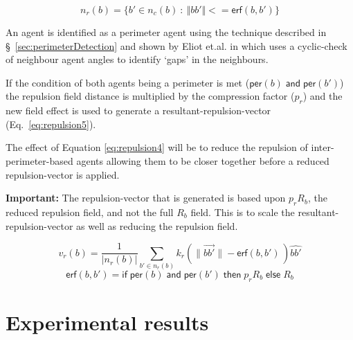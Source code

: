 \documentclass[12pt,a4paper]{IEEEtran}
\newcommand{\important}[1]{\begin{importantBox} \textbf{Important:} #1 \end{importantBox}}
\newcommand{\magn}[1]{\Vert{#1}\Vert}
\begin{document}
\begin{equation}\label{eq:repulsion3}
n_r(b) = \{b' \in n_c(b)~:~\magn{bb'} <= \mathsf{erf}(b,b')\}
\end{equation}

An agent is identified as a perimeter agent using the technique described in \S~\ref{sec:perimeterDetection} and shown by Eliot et.al. in \cite{eliot2019void} which uses a cyclic-check of neighbour agent angles to identify `gaps' in the neighbours.

If the condition of both agents being a perimeter is met ($\mathsf{per}(b) \; \mathsf{and} \; \mathsf{per}(b')$) the repulsion field distance is multiplied by the compression factor ($p_r$) and the new field effect is used to generate a resultant-repulsion-vector (Eq.~\ref{eq:repulsion5}). 

The effect of Equation \ref{eq:repulsion4} will be to reduce the repulsion of inter-perimeter-based agents allowing them to be closer together before a reduced repulsion-vector is applied. 

\important{The repulsion-vector that is generated is based upon $p_rR_b$, the reduced repulsion field, and not the full $R_b$ field. This is to scale the resultant-repulsion-vector as well as reducing the repulsion field.}
\small
\begin{equation}\label{eq:repulsion4}
v_r(b) = \frac{1}{\lvert n_r(b)\rvert}\sum_{b' \in n_r(b)} k_r\left(\lVert\vec{b b'}\rVert - \mathsf{erf}(b,b') \, \right)\widehat{bb'}
\end{equation}
\normalsize
\small
\begin{equation}\label{eq:repulsion5}
\mathsf{erf}(b, b') = \mathsf{if} \;
\mathsf{per}(b) \; \mathsf{and} \; \mathsf{per}(b') \; \mathsf{then} \;
p_rR_b \; \mathsf{else} \; R_b
\end{equation}
\normalsize

\section{Experimental results\label{sec:ExperimentalResults}}
\end{document}
